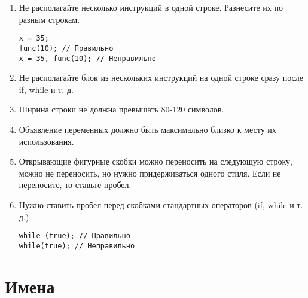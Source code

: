 \documentclass[10pt]{article}
\begin{document}
\begin{enumerate}
\item Не располагайте несколько инструкций в одной строке. Разнесите их по разным строкам.

\begin{lstlisting}
x = 35;
func(10); // Правильно
x = 35, func(10); // Неправильно
\end{lstlisting}

\item Не располагайте блок из нескольких инструкций на одной строке сразу после if, while и т. д.

\item Ширина строки не должна превышать 80-120 символов.

\item Объявление переменных должно быть максимально близко к месту их использования.

\item Открывающие фигурные скобки можно переносить на следующую строку, можно не переносить, но нужно придерживаться одного стиля. Если не переносите, то ставьте пробел.

\item Нужно ставить пробел перед скобками стандартных операторов (if, while и т. д.)

\begin{lstlisting}
while (true); // Правильно
while(true); // Неправильно
\end{lstlisting}

\end{enumerate}

\section{Имена}
\end{document}
